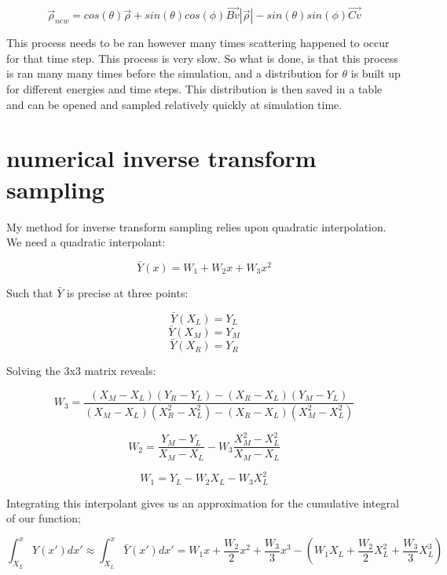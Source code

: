 \documentclass[]{article}
\begin{document}
\begin{equation}
\vec{\rho}_{new}= cos(\theta) \vec{\rho} + sin(\theta) cos(\phi) \vec{Bv} \left|\vec{\rho} \right| - sin(\theta) sin(\phi) \vec{Cv} 
\end{equation}

This process needs to be ran however many times scattering happened to occur for that time step. This process is very slow. So what is done, is that this process is ran many many times before the simulation, and a distribution for $\theta$ is built up for different energies and time steps. This distribution is then saved in a table and can be opened and sampled relatively quickly at simulation time.


\section{numerical inverse transform sampling}

My method for inverse transform sampling relies upon quadratic interpolation. We need a quadratic interpolant:

\begin{equation}
\label{second_order_interpolant_eq}
\bar{Y}(x)=W_1 +W_2 x + W_3 x^2
\end{equation}

Such that $\bar{Y}$ is precise at three points:

\[ \bar{Y}(X_L)=Y_L \]
\[ \bar{Y}(X_M)=Y_M \]
\[ \bar{Y}(X_R)=Y_R \]

Solving the 3x3 matrix reveals:

\begin{equation}
W_3=\frac{(X_M-X_L)(Y_R-Y_L) - (X_R-X_L)(Y_M-Y_L)  }{ (X_M-X_L)(X_R^2-X_L^2) - (X_R-X_L)(X_M^2-X_L^2)   }
\end{equation}

\begin{equation}
W_2=\frac{  Y_M - Y_L  }{ X_M-X_L  } - W_3 \frac{X_M^2-X_L^2}{X_M-X_L}
\end{equation}

\begin{equation}
W_1=Y_L - W_2X_L - W_3X_L^2
\end{equation}

Integrating this interpolant gives us an approximation for the cumulative integral of our function;

\begin{equation}
\label{quadrature_eq}
\int_{X_L}^{x} Y(x') dx' \approx \int_{X_L}^{x} \bar{Y}(x') dx' = W_1x + \frac{W_2}{2}x^2 + \frac{W_3}{3}x^3 -(W_1X_L + \frac{W_2}{2}X_L^2 + \frac{W_3}{3}X_L^3)
\end{equation}
\end{document}
